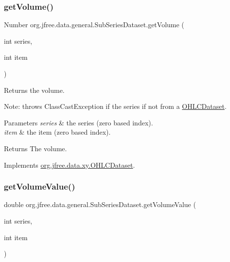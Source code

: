 \subsubsection{\texorpdfstring{get\+Volume()}{getVolume()}}
{\footnotesize\ttfamily Number org.\+jfree.\+data.\+general.\+Sub\+Series\+Dataset.\+get\+Volume (\begin{DoxyParamCaption}\item[{int}]{series,  }\item[{int}]{item }\end{DoxyParamCaption})}

Returns the volume. 

Note\+: throws {\ttfamily Class\+Cast\+Exception} if the series if not from a \mbox{\hyperlink{}{O\+H\+L\+C\+Dataset}}.


\begin{DoxyParams}{Parameters}
{\em series} & the series (zero based index). \\
\hline
{\em item} & the item (zero based index).\\
\hline
\end{DoxyParams}
\begin{DoxyReturn}{Returns}
The volume. 
\end{DoxyReturn}


Implements \mbox{\hyperlink{interfaceorg_1_1jfree_1_1data_1_1xy_1_1_o_h_l_c_dataset_a05012f783f010c1a62873a0c40e7b7fa}{org.\+jfree.\+data.\+xy.\+O\+H\+L\+C\+Dataset}}.

\mbox{\label{classorg_1_1jfree_1_1data_1_1general_1_1_sub_series_dataset_ae13206ea086cd80ef9b9a4cb11c8b174}} 
\subsubsection{\texorpdfstring{get\+Volume\+Value()}{getVolumeValue()}}
{\footnotesize\ttfamily double org.\+jfree.\+data.\+general.\+Sub\+Series\+Dataset.\+get\+Volume\+Value (\begin{DoxyParamCaption}\item[{int}]{series,  }\item[{int}]{item }\end{DoxyParamCaption})}

